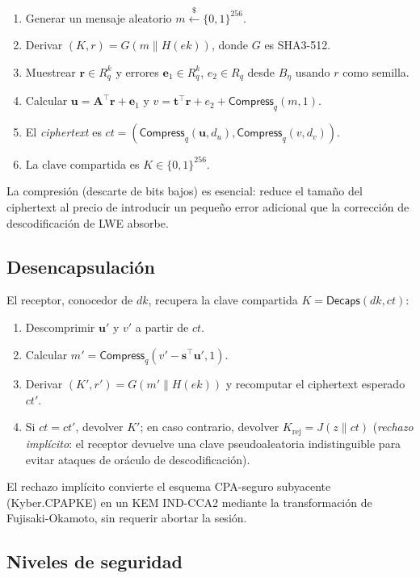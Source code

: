 \begin{enumerate}
  \item Generar un mensaje aleatorio $m \xleftarrow{\$} \{0,1\}^{256}$.
  \item Derivar $(K, r) = G(m \| H(ek))$, donde $G$ es SHA3-512.
  \item Muestrear $\mathbf{r} \in R_q^k$ y errores $\mathbf{e}_1 \in R_q^k$, $e_2 \in R_q$ desde $B_\eta$ usando $r$ como semilla.
  \item Calcular $\mathbf{u} = \mathbf{A}^\top \mathbf{r} + \mathbf{e}_1$ y $v = \mathbf{t}^\top \mathbf{r} + e_2 + \textsf{Compress}_q(m, 1)$.
  \item El \emph{ciphertext} es $ct = (\textsf{Compress}_q(\mathbf{u}, d_u), \textsf{Compress}_q(v, d_v))$.
  \item La clave compartida es $K \in \{0,1\}^{256}$.
\end{enumerate}

La compresión (descarte de bits bajos) es esencial: reduce el tamaño del ciphertext al precio de introducir un pequeño error adicional que la corrección de descodificación de LWE absorbe.

\subsection{Desencapsulación}

El receptor, conocedor de $dk$, recupera la clave compartida $K = \textsf{Decaps}(dk, ct)$:

\begin{enumerate}
  \item Descomprimir $\mathbf{u}'$ y $v'$ a partir de $ct$.
  \item Calcular $m' = \textsf{Compress}_q(v' - \mathbf{s}^\top \mathbf{u}', 1)$.
  \item Derivar $(K', r') = G(m' \| H(ek))$ y recomputar el ciphertext esperado $ct'$.
  \item Si $ct = ct'$, devolver $K'$; en caso contrario, devolver $K_{\text{rej}} = J(z \| ct)$ (\emph{rechazo implícito}: el receptor devuelve una clave pseudoaleatoria indistinguible para evitar ataques de oráculo de descodificación).
\end{enumerate}

El rechazo implícito convierte el esquema CPA-seguro subyacente (Kyber.CPAPKE) en un KEM IND-CCA2 mediante la transformación de Fujisaki-Okamoto, sin requerir abortar la sesión.

\subsection{Niveles de seguridad}

